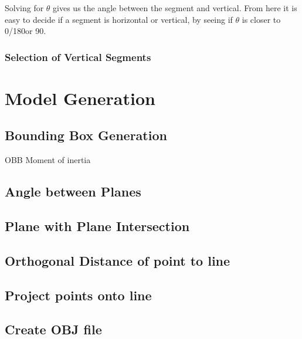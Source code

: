 				Solving for $\theta$ gives us the angle between the segment and vertical. From here it is easy to decide if a segment is horizontal or vertical, by seeing if $\theta$ is closer to 0\textdegree/180\textdegree or 90\textdegree.

		\subsubsection{Selection of Vertical Segments}
			


\section{Model Generation}
		\subsection{Bounding Box Generation}
		OBB
		Moment of inertia
		
		\subsection{Angle between Planes}
		
		\subsection{Plane with Plane Intersection}
		
		\subsection{Orthogonal Distance of point to line}
		
		\subsection{Project points onto line}
		
		\subsection{Create OBJ file}

	


